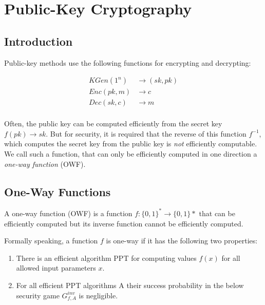 \chapter{Public-Key Cryptography}\label{ch:pub_key_crypto}

\section{Introduction}\label{sec:pubkey:intro}

Public-key methods use the following functions for encrypting and decrypting:

\begin{align*}
    KGen(1^n)  & \rightarrow (sk, pk) \\
    Enc(pk, m) & \rightarrow c        \\
    Dec(sk, c) & \rightarrow m        \\
\end{align*}

Often, the public key can be computed efficiently from the secret key $f(pk) \rightarrow sk$.
But for security, it is required that the reverse of this function $f^{-1}$, which computes the secret key from the public key is \emph{not} efficiently computable.
We call such a function, that can only be efficiently computed in one direction a \emph{one-way function} (OWF).

\section{One-Way Functions}\label{sec:owf}

A one-way function (OWF) is a function $f: \{0,1\}^* \rightarrow \{0,1\}*$ that can be efficiently computed but its inverse function cannot be efficiently computed.

Formally speaking, a function $f$ is one-way if it has the following two properties:

\begin{enumerate}
    \item There is an efficient algorithm PPT for computing values $f(x)$ for all allowed input parameters $x$.
    \item For all efficient PPT algorithms A their success probability in the below security game $G^{inv}_{f,A}$ is negligible.
\end{enumerate}


